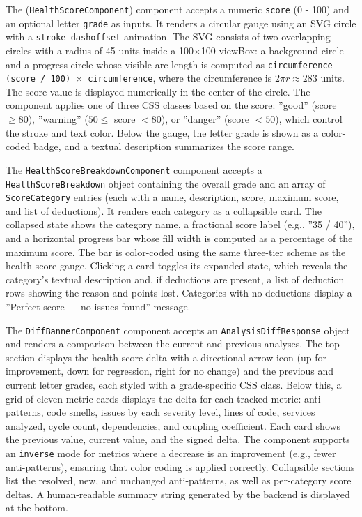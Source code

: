 \par The (\texttt{HealthScoreComponent}) component accepts a numeric \texttt{score} (0 - 100) and an optional letter \texttt{grade} as inputs. It renders a circular gauge using an SVG circle with a \texttt{stroke-dashoffset} animation. The SVG consists of two overlapping circles with a radius of 45 units inside a 100$\times$100 viewBox: a background circle and a progress circle whose visible arc length is computed as \texttt{circumference $-$ (score / 100) $\times$ circumference}, where the circumference is $2\pi r \approx 283$ units. The score value is displayed numerically in the center of the circle. The component applies one of three CSS classes based on the score: ''good'' (score $\geq 80$), ''warning'' ($50 \leq$ score $< 80$), or ''danger'' (score $< 50$), which control the stroke and text color. Below the gauge, the letter grade is shown as a color-coded badge, and a textual description summarizes the score range.

\par The \texttt{HealthScoreBreakdownComponent} component accepts a \texttt{Hea\-lth\-Sco\-re\-Break\-down} object containing the overall grade and an array of \texttt{ScoreCategory} entries (each with a name, description, score, maximum score, and list of deductions). It renders each category as a collapsible card. The collapsed state shows the category name, a fractional score label (e.g., ''35 / 40''), and a horizontal progress bar whose fill width is computed as a percentage of the maximum score. The bar is color-coded using the same three-tier scheme as the health score gauge. Clicking a card toggles its expanded state, which reveals the category's textual description and, if deductions are present, a list of deduction rows showing the reason and points lost. Categories with no deductions display a ''Perfect score --- no issues found'' message.

\par The \texttt{DiffBannerComponent} component accepts an \texttt{Analysis\-Diff\-Response} object and renders a comparison between the current and previous analyses. The top section displays the health score delta with a directional arrow icon (up for improvement, down for regression, right for no change) and the previous and current letter grades, each styled with a grade-specific CSS class. Below this, a grid of eleven metric cards displays the delta for each tracked metric: anti-patterns, code smells, issues by each severity level, lines of code, services analyzed, cycle count, dependencies, and coupling coefficient. Each card shows the previous value, current value, and the signed delta. The component supports an \texttt{inverse} mode for metrics where a decrease is an improvement (e.g., fewer anti-patterns), ensuring that color coding is applied correctly. Collapsible sections list the resolved, new, and unchanged anti-patterns, as well as per-category score deltas. A human-readable summary string generated by the backend is displayed at the bottom.


